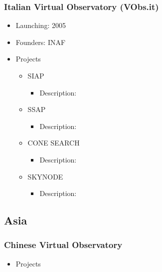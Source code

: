 \documentclass[11pt]{article}
\begin{document}
              \subsubsection{Italian Virtual Observatory (VObs.it)}
                  \begin{itemize}
                      \item Launching: 2005
                      \item Founders: INAF
                      \item Projects
                          \begin{itemize}
                              \item SIAP
                                  \begin{itemize}
                                      \item Description: 
                                  \end{itemize}
                              \item SSAP
                                  \begin{itemize}
                                      \item Description: 
                                  \end{itemize}
                              \item CONE SEARCH
                                  \begin{itemize}
                                      \item Description: 
                                  \end{itemize}
                              \item SKYNODE
                                  \begin{itemize}
                                      \item Description: 
                                  \end{itemize}
                          \end{itemize}
                  \end{itemize}

      \subsection{Asia}
          \subsubsection{Chinese Virtual Observatory}
              \begin{itemize}
                  \item Projects
              \end{itemize}
\end{document}
